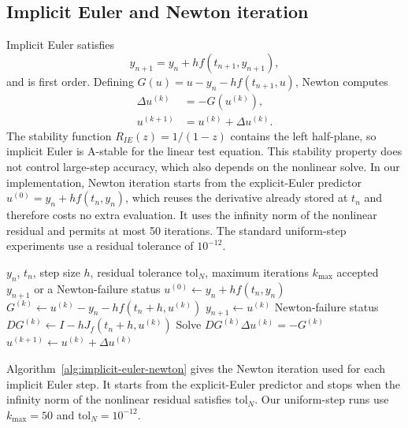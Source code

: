 \subsection{Implicit Euler and Newton iteration}
Implicit Euler satisfies
\[
y_{n+1}=y_n+h f(t_{n+1},y_{n+1}),
\]
and is first order. Defining $G(u)=u-y_n-hf(t_{n+1},u)$, Newton computes
\begin{align*}
[I-hJ_f(t_{n+1},u^{(k)})]\Delta u^{(k)}&=-G(u^{(k)}),\\
u^{(k+1)}&=u^{(k)}+\Delta u^{(k)}.
\end{align*}
The stability function $R_{IE}(z)=1/(1-z)$ contains the left half-plane, so implicit Euler is A-stable for the linear test equation. This stability property does not control large-step accuracy, which also depends on the nonlinear solve. In our implementation, Newton iteration starts from the explicit-Euler predictor $u^{(0)}=y_n+hf(t_n,y_n)$, which reuses the derivative already stored at $t_n$ and therefore costs no extra evaluation. It uses the infinity norm of the nonlinear residual and permits at most 50 iterations. The standard uniform-step experiments use a residual tolerance of $10^{-12}$.

\begin{algorithm}[H]
\caption{Implicit Euler with Newton iteration}
\label{alg:implicit-euler-newton}
\begin{algorithmic}[1]
\Require $y_n$, $t_n$, step size $h$, residual tolerance $\mathrm{tol}_N$, maximum iterations $k_{\max}$
\Ensure accepted $y_{n+1}$ or a Newton-failure status
\State $u^{(0)}\gets y_n+h f(t_n,y_n)$ 
  \State $G^{(k)}\gets u^{(k)}-y_n-hf(t_n+h,u^{(k)})$
    \State \Return $y_{n+1}\gets u^{(k)}$
  \EndIf
    \State \Return Newton-failure status
  \EndIf
  \State $DG^{(k)}\gets I-hJ_f(t_n+h,u^{(k)})$
  \State Solve $DG^{(k)}\Delta u^{(k)}=-G^{(k)}$
  \State $u^{(k+1)}\gets u^{(k)}+\Delta u^{(k)}$
\EndFor
\end{algorithmic}
\end{algorithm}

Algorithm~\ref{alg:implicit-euler-newton} gives the Newton iteration used for each implicit Euler step. It starts from the explicit-Euler predictor and stops when the infinity norm of the nonlinear residual satisfies $\mathrm{tol}_N$. Our uniform-step runs use $k_{\max}=50$ and $\mathrm{tol}_N=10^{-12}$.

